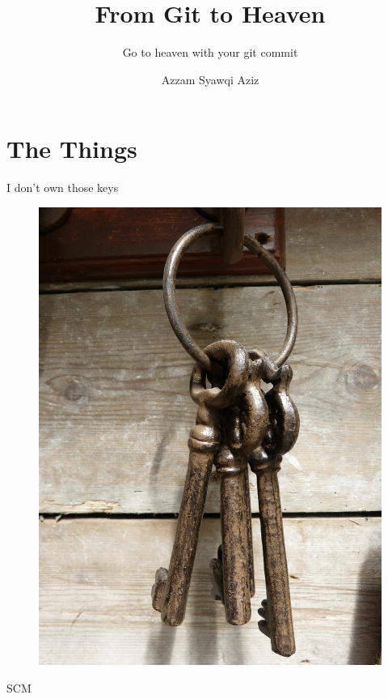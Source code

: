 \documentclass[notes,usenames,dvipsnames]{beamer}       %
\title{From Git to Heaven}
\subtitle{Go to heaven with your git commit}
\author{Azzam Syawqi Aziz}
\begin{document}
\maketitle

\section{The Things}

\begin{frame}{I don't own those keys}
  \begin{figure}
    \centering
    \includegraphics[scale=0.1]{img/key.jpg}
  \end{figure}
\end{frame}

\begin{frame}%
  \begin{center}
    \Huge SCM
  \end{center}
\end{frame}
\end{document}
